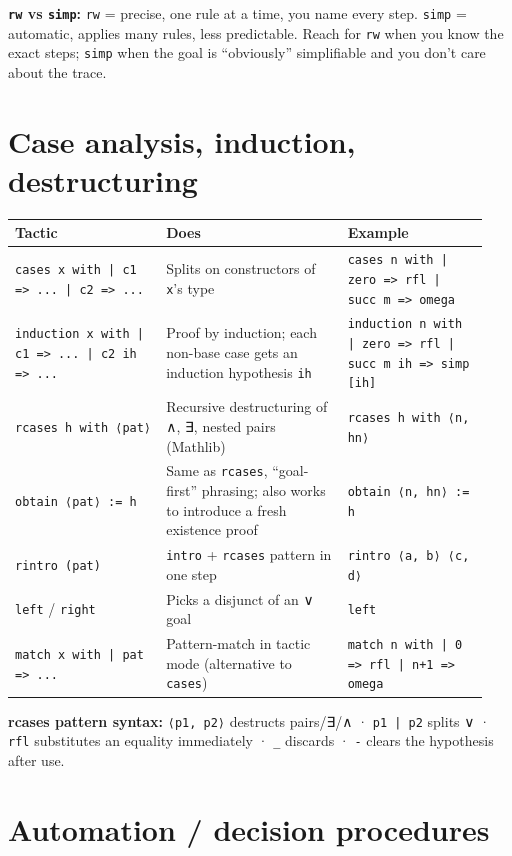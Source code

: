 \textbf{\texttt{rw} vs \texttt{simp}:} \texttt{rw} = precise, one rule at a time, you name every step. \texttt{simp} = automatic, applies many rules, less predictable. Reach for \texttt{rw} when you know the exact steps; \texttt{simp} when the goal is ``obviously'' simplifiable and you don't care about the trace.

\section{Case analysis, induction, destructuring}

\begin{center}
\begin{tabular}{@{}p{0.30\linewidth}p{0.36\linewidth}p{0.28\linewidth}@{}}
\hline
\textbf{Tactic} & \textbf{Does} & \textbf{Example} \\
\hline
\texttt{cases x with | c1 => ... | c2 => ...} & Splits on constructors of \texttt{x}'s type & \texttt{cases n with | zero => rfl | succ m => omega} \\
\texttt{induction x with | c1 => ... | c2 ih => ...} & Proof by induction; each non-base case gets an induction hypothesis \texttt{ih} & \texttt{induction n with | zero => rfl | succ m ih => simp [ih]} \\
\texttt{rcases h with ⟨pat⟩} & Recursive destructuring of ∧, ∃, nested pairs (Mathlib) & \texttt{rcases h with ⟨n, hn⟩} \\
\texttt{obtain ⟨pat⟩ := h} & Same as \texttt{rcases}, ``goal-first'' phrasing; also works to introduce a fresh existence proof & \texttt{obtain ⟨n, hn⟩ := h} \\
\texttt{rintro (pat)} & \texttt{intro} + \texttt{rcases} pattern in one step & \texttt{rintro ⟨a, b⟩ ⟨c, d⟩} \\
\texttt{left} / \texttt{right} & Picks a disjunct of an ∨ goal & \texttt{left} \\
\texttt{match x with | pat => ...} & Pattern-match in tactic mode (alternative to \texttt{cases}) & \texttt{match n with | 0 => rfl | n+1 => omega} \\
\hline
\end{tabular}
\end{center}

\textbf{rcases pattern syntax:} \texttt{⟨p1, p2⟩} destructs pairs/∃/∧ · \texttt{p1 | p2} splits ∨ · \texttt{rfl} substitutes an equality immediately · \texttt{\_} discards · \texttt{-} clears the hypothesis after use.

\section{Automation / decision procedures}

